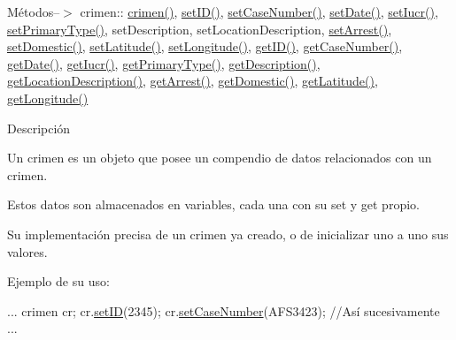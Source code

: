 Métodos--$>$ crimen\-:\-: \hyperlink{classcrimen_ab1147e36869c7e635699e4ef746a7555}{crimen()}, \hyperlink{classcrimen_a2675734f5049f41b5fb5dbc4778df7f8}{set\-I\-D()}, \hyperlink{classcrimen_a98ee8c42a0ec09c704c5f17e812a6bd5}{set\-Case\-Number()}, \hyperlink{classcrimen_ac308c139bb8b599a7badbecd91bfbc5a}{set\-Date()}, \hyperlink{classcrimen_ab51525fd95906f7d0980962c94f7abdb}{set\-Iucr()}, \hyperlink{classcrimen_a65ea5319dcfe53ed312aa5edbbc5870d}{set\-Primary\-Type()}, set\-Description, set\-Location\-Description, \hyperlink{classcrimen_ae08b85470038469179a01ba753b7641a}{set\-Arrest()}, \hyperlink{classcrimen_a3ec14cf4bb0464350d8efd98d2679d41}{set\-Domestic()}, \hyperlink{classcrimen_aff1f4343bad1957f290ea25df45878fa}{set\-Latitude()}, \hyperlink{classcrimen_ab150b316a5f17058f817e3e8908ad821}{set\-Longitude()}, \hyperlink{classcrimen_a855eab30a304a6498828cb5d85a4e0e3}{get\-I\-D()}, \hyperlink{classcrimen_ab3c025eb20cdcea9192ee190fa2af015}{get\-Case\-Number()}, \hyperlink{classcrimen_a8a6712e536211034819441ab87e1c215}{get\-Date()}, \hyperlink{classcrimen_a6d2bac20ef41f8c9944ca7deb8cc2ed5}{get\-Iucr()}, \hyperlink{classcrimen_ae47e93acec39b388cde221a679bccf9c}{get\-Primary\-Type()}, \hyperlink{classcrimen_a61789d65209d167149df197272d8feba}{get\-Description()}, \hyperlink{classcrimen_a9de655b3eea3592f6e5d017e83fd6060}{get\-Location\-Description()}, \hyperlink{classcrimen_a6cab67bfdad566ce444236fc7c8df312}{get\-Arrest()}, \hyperlink{classcrimen_a1849e7a82111773a6919318b9cf1d05d}{get\-Domestic()}, \hyperlink{classcrimen_adfd62cd48c7d1d0259c007d3f6c39d58}{get\-Latitude()}, \hyperlink{classcrimen_a0c24726cd34dc975b3fc7c664287a15c}{get\-Longitude()}

Descripción

Un crimen es un objeto que posee un compendio de datos relacionados con un crimen.

Estos datos son almacenados en variables, cada una con su set y get propio.

Su implementación precisa de un crimen ya creado, o de inicializar uno a uno sus valores.

Ejemplo de su uso\-: 
\begin{DoxyCode}
...
crimen cr;
cr.\hyperlink{classcrimen_a2675734f5049f41b5fb5dbc4778df7f8}{setID}(2345);
cr.\hyperlink{classcrimen_a98ee8c42a0ec09c704c5f17e812a6bd5}{setCaseNumber}(AFS3423);
\textcolor{comment}{//Así sucesivamente}
...
\end{DoxyCode}
 

